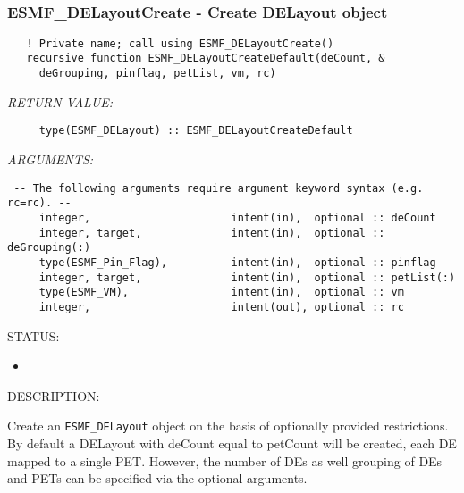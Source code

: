 
\mbox{}\hrulefill\ 
 
\subsubsection [ESMF\_DELayoutCreate] {ESMF\_DELayoutCreate - Create DELayout object}


 
\begin{verbatim}   ! Private name; call using ESMF_DELayoutCreate()
   recursive function ESMF_DELayoutCreateDefault(deCount, &
     deGrouping, pinflag, petList, vm, rc)
           \end{verbatim}{\em RETURN VALUE:}
\begin{verbatim}     type(ESMF_DELayout) :: ESMF_DELayoutCreateDefault\end{verbatim}{\em ARGUMENTS:}
\begin{verbatim} -- The following arguments require argument keyword syntax (e.g. rc=rc). --
     integer,                      intent(in),  optional :: deCount
     integer, target,              intent(in),  optional :: deGrouping(:)
     type(ESMF_Pin_Flag),          intent(in),  optional :: pinflag
     integer, target,              intent(in),  optional :: petList(:)
     type(ESMF_VM),                intent(in),  optional :: vm
     integer,                      intent(out), optional :: rc\end{verbatim}
{\sf STATUS:}
   \begin{itemize}
   \item{}
   \end{itemize}
  
{\sf DESCRIPTION:\\ }


       Create an {\tt ESMF\_DELayout} object on the basis of optionally provided
       restrictions. By default a DELayout with deCount equal to petCount will
       be created, each DE mapped to a single PET. However, the number of DEs
       as well grouping of DEs and PETs can be specified via the optional
       arguments.
  
